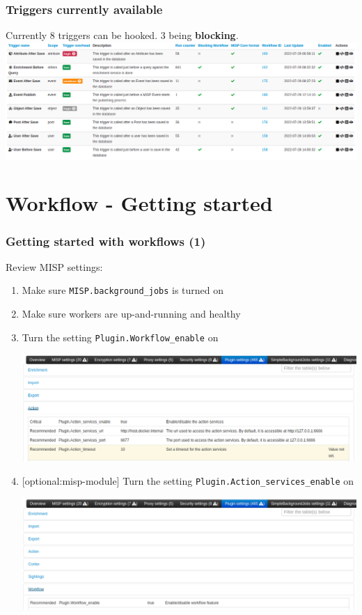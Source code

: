 \begin{frame}
    \frametitle{Triggers currently available}
    Currently 8 triggers can be hooked. 3 being \textbf{blocking}.
    \includegraphics[width=1.0\linewidth]{pictures/triggers.png}
\end{frame}

\section{Workflow - Getting started}
\begin{frame}
    \frametitle{Getting started with workflows (1)}
    Review MISP settings:
    \begin{enumerate}
        \item Make sure \texttt{MISP.background\_jobs} is turned on
        \item Make sure workers are up-and-running and healthy
        \item Turn the setting \texttt{Plugin.Workflow\_enable} on
        \begin{center}
            \includegraphics[width=0.70\linewidth]{pictures/settings-1.png}
        \end{center}
        \item {[optional:misp-module]} Turn the setting \texttt{Plugin.Action\_services\_enable} on
        \begin{center}
            \includegraphics[width=0.70\linewidth]{pictures/settings-2.png}
        \end{center}
    \end{enumerate}
\end{frame}

